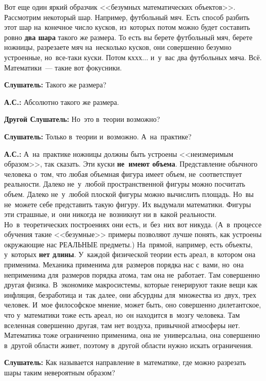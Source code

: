 Вот еще один яркий образчик <<безумных математических объектов>>. Рассмотрим некоторый шар.
Например, футбольный мяч. Есть способ разбить этот шар на~конечное число кусков, из~которых потом
можно будет составить ровно \textbf{два шара} такого же размера. То есть вы берете футбольный мяч, берете
ножницы, разрезаете мяч на~несколько кусков, они совершенно безумно устроенные, но~все-таки куски.
Потом кххх... и~у~вас два футбольных мяча. Всё. Математики~--- такие вот фокусники.

\textbf{Слушатель:} Такого же размера?

\textbf{А.С.:} Абсолютно такого же размера.

\textbf{Другой Слушатель:} Но~это в~теории возможно?

\textbf{Слушатель:} Только в~теории и~возможно. А~на~практике?

\textbf{А.С.:} А~на~практике ножницы должны быть устроены <<неизмеримым образом>>, так сказать. Эти
куски \textbf{не~имеют объема}. Представление обычного человека о~том, что любая объемная фигура имеет
объем, не~соответствует реальности. Далеко не~у~любой пространственной фигуры можно посчитать
объем. Далеко не~у~любой плоской фигуры можно вычислить площадь. Но~вы не~можете себе представить такую фигуру.
Их выдумали математики. Фигуры эти страшные, и~они никогда не~возникнут ни в~какой
реальности. Но~в~теоретических построениях они есть, и~без~них вот никуда. (А~в~процессе обучения
такие <<безумные>> примеры позволяют лучше понять, как устроены окружающие нас РЕАЛЬНЫЕ предметы.)
На~прямой, например, есть объекты, у~которых \textbf{нет длины}. У~каждой физической теории есть ареал,
в~котором она применима. Механика применима для~размеров порядка нас с~вами, но~она неприменима
для~размеров порядка атома, там она не~работает.
 Там совершенно другая физика. В~экономике
макросистемы, которые генерируют такие вещи как инфляция, безработица и~так далее, они абсурдны
для~множества из~двух, трех человек. И~мое философское мнение, может быть, оно совершенно
дилетантское, что у~математики тоже есть ареал, но~он находится в~мозгу человека. Там вселенная
совершенно другая, там нет воздуха, привычной атмосферы нет. Математика тоже ограниченно применима,
она не~универсальна, она совершенно в~другой области живет, поэтому в~другой области нужно искать
ограничения.

\textbf{Слушатель:} Как называется направление в~математике, где можно разрезать шары таким невероятным
образом?

